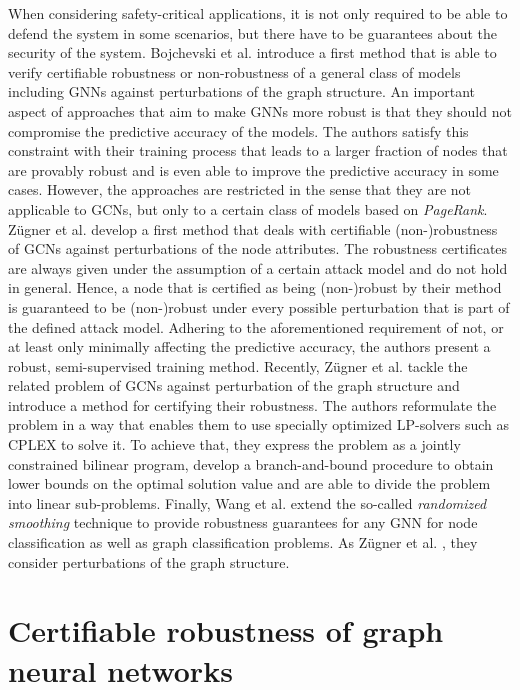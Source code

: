 \documentclass[a4paper,preprint]{sig-alternate}
\begin{document}
When considering safety-critical applications, it is not only required to be able to defend the system in some scenarios, but there
have to be guarantees about the security of the system.
Bojchevski et al. \cite{bojchevski2019certifiable} introduce a first method that is able to verify certifiable robustness or
non-robustness of a general class of models including GNNs against perturbations of the graph structure.
An important aspect of approaches that aim to make GNNs more robust is that they should not compromise the predictive accuracy of the models.
The authors satisfy this constraint with their training process that leads to a larger fraction of nodes that are provably robust
and is even able to improve the predictive accuracy in some cases.
However, the approaches are restricted in the sense that they are not applicable to GCNs, but only to a certain class of models
based on \textit{PageRank}. \cite{10.1145/3394486.3403217}
Zügner et al. \cite{Zuegner_2019} develop a first method that deals with certifiable (non-)robustness of GCNs against perturbations
of the node attributes. The robustness certificates are always given under the assumption of a certain attack model and do not hold in general.
Hence, a node that is certified as being (non-)robust by their method is guaranteed to be (non-)robust under every possible perturbation that is part of the
defined attack model.
Adhering to the aforementioned requirement of not, or at least only minimally affecting the predictive accuracy,
the authors present a robust, semi-supervised training method.
Recently, Zügner et al. \cite{10.1145/3394486.3403217} tackle the related problem of GCNs against perturbation of the graph structure
and introduce a method for certifying their robustness. The authors reformulate the problem in a way that enables them to use specially 
optimized LP-solvers such as CPLEX to solve it. To achieve that, they express the problem as a jointly constrained bilinear program, 
develop a branch-and-bound procedure to obtain lower bounds on the optimal solution value and are able to divide the problem into linear 
sub-problems.
Finally, Wang et al.\cite{Wang_2020} extend the so-called \textit{randomized smoothing} technique to provide robustness guarantees for any
GNN for node classification as well as graph classification problems. As Zügner et al. \cite{10.1145/3394486.3403217}, they consider
perturbations of the graph structure.

\section{Certifiable robustness of graph neural networks}
\label{sec:main_section}
\end{document}
